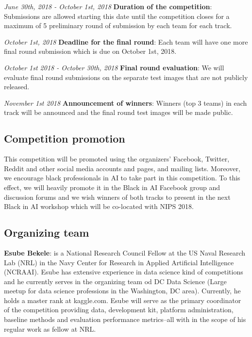 \documentclass[11pt, oneside]{article}
\begin{document}
{\it June 30th, 2018 - October 1st, 2018} {\bf Duration of the competition}: Submissions are allowed starting this date until the competition closes for a maximum of 5 preliminary round of submission by each team for each track.

{\it October 1st, 2018} {\bf Deadline for the final round}: Each team will have one more final round submission which is due on October 1st, 2018.

{\it October 1st 2018 - October 30th, 2018} {\bf Final round evaluation}: We will evaluate final round submissions on the separate test images that are not publicly released.

{\it November 1st 2018} {\bf Announcement of winners}: Winners (top 3 teams) in each track will be announced and the final round test images will be made public.

\subsection{Competition promotion}

This competition will be promoted using the organizers' Facebook, Twitter, Reddit and other social media accounts and pages, and mailing lists. Moreover, we encourage black professionals in AI to take part in this competition. To this effect, we will heavily promote it in the Black in AI Facebook group and discussion forums and we wish winners of both tracks to present in the next Black in AI workshop which will be co-located with NIPS 2018.

\subsection{Organizing team}

{\bf Esube Bekele}: is a National Research Council Fellow at the US Naval Research Lab (NRL) in the Navy Center for Research in Applied Artificial Intelligence (NCRAAI). Esube has extensive experience in data science kind of competitions and he currently serves in the organizing team od DC Data Science (Large meetup for data science professions in the Washington, DC area). Currently, he holds a master rank at kaggle.com. Esube will serve as the primary coordinator of the competition providing data, development kit, platform administration, baseline methods and evaluation performance metrics--all with in the scope of his regular work as fellow at NRL.
\end{document}
